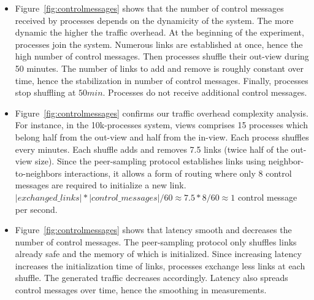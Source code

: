 \begin{itemize}
\item Figure~\ref{fig:controlmessages} shows that the number of control messages
  received by processes depends on the dynamicity of the system. The more
  dynamic the higher the traffic overhead. At the beginning of the experiment,
  processes join the system. Numerous links are established at once, hence the
  high number of control messages. Then processes shuffle their out-view during
  50 minutes. The number of links to add and remove is roughly constant over
  time, hence the stabilization in number of control messages. Finally,
  processes stop shuffling at $50min$. Processes do not receive additional
  control messages.
\item Figure~\ref{fig:controlmessages} confirms our traffic overhead complexity
  analysis. For instance, in the 10k-processes system, views comprises 15
  processes which belong half from the out-view and half from the in-view.  Each
  process shuffles every minutes. Each shuffle adds and removes 7.5 links (twice
  half of the out-view size). Since the peer-sampling protocol establishes links
  using neighbor-to-neighbors interactions, it allows a form of routing where
  only 8 control messages are required to initialize a new link.
  $|exchanged\_links|*|control\_messages|/60 \approx 7.5*8/60 \approx 1$ control
  message per second.
\item Figure~\ref{fig:controlmessages} shows that latency smooth and decreases
  the number of control messages. The peer-sampling protocol only shuffles links
  already safe and the memory of which is initialized. Since increasing latency
  increases the initialization time of links, processes exchange less links at
  each shuffle. The generated traffic decreases accordingly. Latency also
  spreads control messages over time, hence the smoothing in measurements.
\end{itemize}


